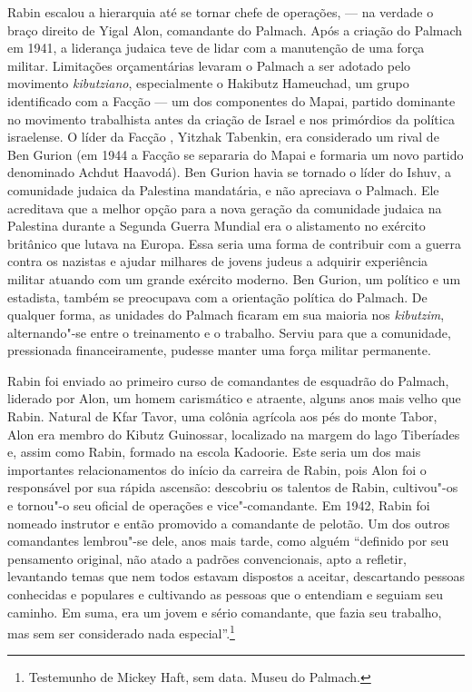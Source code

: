 Rabin escalou a hierarquia até se tornar chefe de operações, --- na
verdade o braço direito de Yigal Alon, comandante do Palmach. Após a
criação do Palmach em 1941, a liderança judaica teve de lidar com a
manutenção de uma força militar. Limitações orçamentárias
levaram o Palmach a ser adotado pelo movimento \emph{kibutziano}, especialmente
o Hakibutz Hameuchad, um grupo identificado com a Facção  --- um dos
componentes do Mapai, partido dominante no movimento trabalhista
antes da criação de Israel e nos primórdios da política israelense. O
líder da Facção , Yitzhak Tabenkin, era considerado um rival de Ben
Gurion (em 1944 a Facção  se separaria do Mapai e formaria um novo
partido denominado Achdut Haavodá). Ben Gurion havia se
tornado o líder do Ishuv, a comunidade judaica da Palestina mandatária, e
não apreciava o Palmach. Ele acreditava que a melhor opção
para a nova geração da comunidade judaica na Palestina durante a Segunda
Guerra Mundial era o alistamento no exército britânico que lutava na
Europa. Essa seria uma forma de contribuir com a guerra contra os
nazistas e ajudar milhares de jovens judeus a adquirir experiência
militar atuando com um grande exército moderno. Ben Gurion, um político
e um estadista, também se preocupava com a orientação política
do Palmach. De qualquer forma, as unidades do Palmach ficaram em sua
maioria nos \emph{kibutzim}, alternando"-se entre o treinamento e o trabalho.
Serviu para que a comunidade, pressionada financeiramente, pudesse
manter uma força militar permanente.

Rabin foi enviado ao primeiro curso de comandantes de esquadrão do
Palmach, liderado por Alon, um homem carismático e atraente, alguns anos
mais velho que Rabin. Natural de Kfar Tavor, uma colônia agrícola aos
pés do monte Tabor, Alon era membro do Kibutz Guinossar, localizado na
margem do lago Tiberíades e, assim como Rabin, formado na escola
Kadoorie. Este seria um dos mais importantes relacionamentos do início
da carreira de Rabin, pois Alon foi o responsável por sua rápida
ascensão: descobriu os talentos de Rabin, cultivou"-os e tornou"-o seu
oficial de operações e vice"-comandante. Em 1942, Rabin foi nomeado
instrutor e então promovido a comandante de pelotão. Um dos outros
comandantes lembrou"-se dele, anos mais tarde, como alguém
``definido por seu pensamento original, não atado a padrões
convencionais, apto a refletir, levantando temas que nem todos estavam
dispostos a aceitar, descartando pessoas conhecidas e populares e
cultivando as pessoas que o entendiam e seguiam seu caminho. Em suma,
era um jovem e sério comandante, que fazia seu trabalho, mas sem ser
considerado nada especial''.\footnote{Testemunho de Mickey Haft, sem data. Museu do Palmach.}

